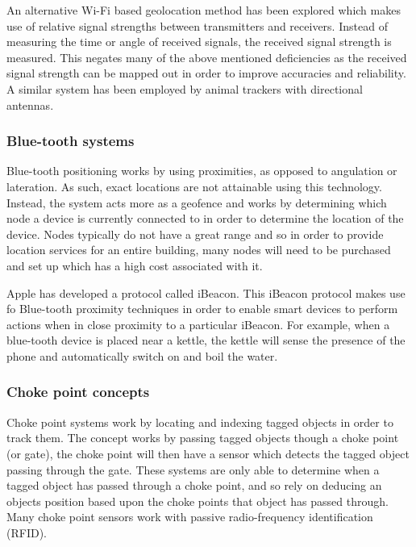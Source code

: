 \documentclass[11pt,a4paper]{report}
\begin{document}
			An alternative Wi-Fi based geolocation method has been explored which makes use of relative signal strengths between transmitters and receivers. Instead of measuring the time or angle of received signals, the received signal strength is measured. This negates many of the above mentioned deficiencies as the received signal strength can be mapped out in order to improve accuracies and reliability. A similar system has been employed by animal trackers with directional antennas.
			\cite{yongguang_chen_signal_2002}
	
		\subsubsection{Blue-tooth systems}
			Blue-tooth positioning works by using proximities, as opposed to angulation or lateration. As such, exact locations are not attainable using this technology. Instead, the system acts more as a geofence and works by determining which node a device is currently connected to in order to determine the location of the device. Nodes typically do not have a great range and so in order to provide location services for an entire building, many nodes will need to be purchased and set up which has a high cost associated with it.
		
			Apple has developed a protocol called iBeacon. This iBeacon protocol makes use fo Blue-tooth proximity techniques in order to enable smart devices to perform actions when in close proximity to a particular iBeacon. For example, when a blue-tooth device is placed near a kettle, the kettle will sense the presence of the phone and automatically switch on and boil the water.
			\cite{_everything_????}
		
		\subsubsection{Choke point concepts}
			\label{choke_points}
			Choke point systems work by locating and indexing tagged objects in order to track them. The concept works by passing tagged objects though a choke point (or gate), the choke point will then have a sensor which detects the tagged object passing through the gate. These systems are only able to determine when a tagged object has passed through a choke point, and so rely on deducing an objects position based upon the choke points that object has passed through.
			Many choke point sensors work with passive radio-frequency identification (RFID).
			\cite{reza_investigation_2008}
		
\end{document}
